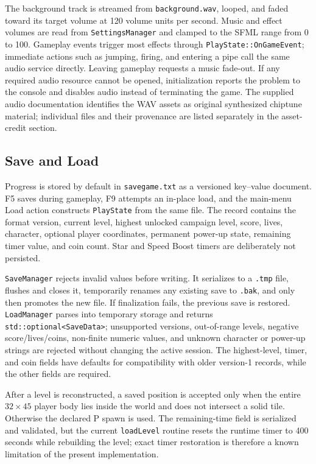 \documentclass{template}
\begin{document}
The background track is streamed from \texttt{background.wav}, looped, and
faded toward its target volume at 120 volume units per second. Music and effect
volumes are read from \texttt{SettingsManager} and clamped to the SFML range
from 0 to 100. Gameplay events trigger most effects through
\texttt{PlayState::OnGameEvent}; immediate actions such as jumping, firing, and
entering a pipe call the same audio service directly. Leaving gameplay requests
a music fade-out. If any required audio resource cannot be opened,
initialization reports the problem to the console and disables audio instead
of terminating the game. The supplied audio documentation identifies the WAV
assets as original synthesized chiptune material; individual files and their
provenance are listed separately in the asset-credit section.

\subsection{Save and Load}

Progress is stored by default in \texttt{savegame.txt} as a versioned
key--value document. F5 saves during gameplay, F9 attempts an in-place load,
and the main-menu Load action constructs \texttt{PlayState} from the same file.
The record contains the format version, current level, highest unlocked
campaign level, score, lives, character, optional player coordinates, permanent
power-up state, remaining timer value, and coin count. Star and Speed Boost
timers are deliberately not persisted.

\texttt{SaveManager} rejects invalid values before writing. It serializes to a
\texttt{.tmp} file, flushes and closes it, temporarily renames any existing
save to \texttt{.bak}, and only then promotes the new file. If finalization
fails, the previous save is restored. \texttt{LoadManager} parses into
temporary storage and returns \texttt{std::optional<SaveData>}; unsupported
versions, out-of-range levels, negative score/lives/coins, non-finite numeric
values, and unknown character or power-up strings are rejected without
changing the active session. The highest-level, timer, and coin fields have
defaults for compatibility with older version-1 records, while the other
fields are required.

After a level is reconstructed, a saved position is accepted only when the
entire $32\times45$ player body lies inside the world and does not intersect a
solid tile. Otherwise the declared P spawn is used. The remaining-time field
is serialized and validated, but the current \texttt{loadLevel} routine resets
the runtime timer to 400 seconds while rebuilding the level; exact timer
restoration is therefore a known limitation of the present implementation.
\end{document}
